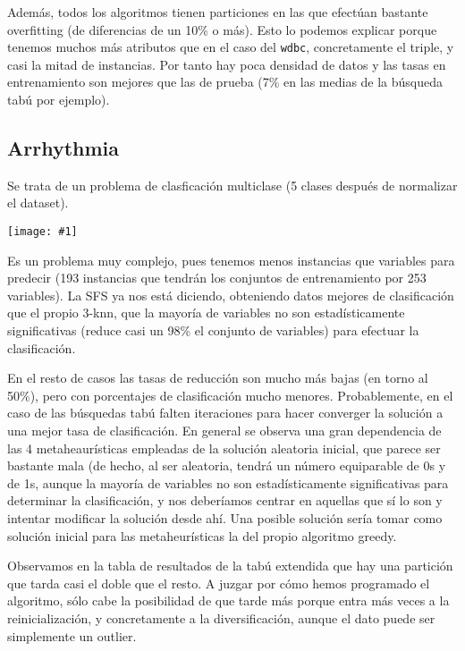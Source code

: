 \documentclass[a4paper,11pt]{article}
\newcommand{\imagen}[4]{
  \begin{minipage}{\linewidth}
    \centering
    \texttt{[image: \#1]}
    \captionof{figure}{#2}
    \label{#3}
  \end{minipage} 
}
\begin{document}
  Además, todos los algoritmos tienen particiones en las que efectúan bastante overfitting (de diferencias de un 10\% o más).
  Esto lo podemos explicar porque tenemos muchos más atributos que en el caso del \texttt{wdbc}, concretamente el triple, y
  casi la mitad de instancias. Por tanto hay poca densidad de datos y las tasas en entrenamiento son mejores que las de 
  prueba (7\% en las medias de la búsqueda tabú por ejemplo).
  
  \subsection{Arrhythmia}
  
  Se trata de un problema de clasficación multiclase (5 clases después de normalizar el dataset).
  
  \imagen{../data/arrhythmia.png}{Tasas de clasificación en Arrhythmia}{wdbcgraph}{0.7}
  
  Es un problema muy complejo, pues tenemos menos instancias que variables para predecir (193 instancias que tendrán
  los conjuntos de entrenamiento por 253 variables). La SFS ya nos está diciendo, obteniendo datos mejores de clasificación
  que el propio 3-knn, que la mayoría de variables no son estadísticamente significativas (reduce casi un 98\% el conjunto de variables)
  para efectuar la clasificación.
  
  En el resto de casos las tasas de reducción son mucho más bajas (en torno al 50\%), pero con porcentajes de clasificación
  mucho menores. Probablemente, en el caso de las búsquedas tabú falten iteraciones para hacer converger la solución a una mejor
  tasa de clasificación. En general se observa una gran dependencia de las 4 metaheaurísticas empleadas de la solución aleatoria
  inicial, que parece ser bastante mala (de hecho, al ser aleatoria, tendrá un número equiparable de 0s y de 1s, aunque la mayoría
  de variables no son estadísticamente significativas para determinar la clasificación, y nos deberíamos centrar en aquellas
  que sí lo son y intentar modificar la solución desde ahí. Una posible solución sería tomar como solución inicial para las metaheurísticas
  la del propio algoritmo greedy.
  
  Observamos en la tabla de resultados de la tabú extendida que hay una partición que tarda casi el doble que el resto.
  A juzgar por cómo hemos programado el algoritmo, sólo cabe la posibilidad de que tarde más porque entra más veces a la
  reinicialización, y concretamente a la diversificación, aunque el dato puede ser simplemente un outlier.
  
\end{document}
